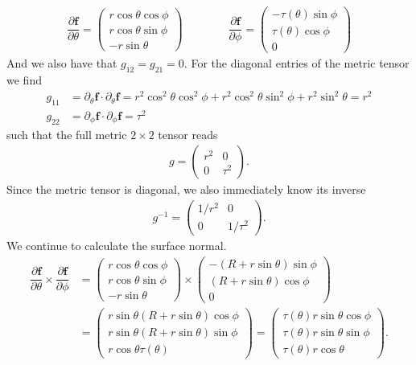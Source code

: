 \documentclass[11pt, DINA4, fleqn]{amsart}
\def\vf{\boldsymbol{f}\xspace}
\begin{document}
\begin{align}
\dfrac{\partial \vf}{\partial \theta} =
\begin{pmatrix}
r\cos\theta\cos\phi \\
r\cos\theta\sin\phi \\
-r\sin\theta
\end{pmatrix}
\qquad \qquad
\dfrac{\partial \vf}{\partial \phi} =
\begin{pmatrix}
-\tau(\theta) \sin\phi\\
\tau(\theta) \cos\phi \\
0
\end{pmatrix}
\end{align}
And we also have that $g_{12} = g_{21} = 0$.
For the diagonal entries of the metric tensor we find
\begin{align}
g_{11} &= \partial_{\theta}\vf \cdot \partial_{\theta}\vf= 
r^2\cos^2\theta\cos^2\phi + r^2\cos^2\theta\sin^2\phi + r^2\sin^2\theta = r^2 \\
g_{22} &= \partial_{\phi}\vf \cdot \partial_{\phi}\vf= \tau^2
\end{align}
such that the full metric $2\times 2$ tensor reads
\begin{align}
g = \begin{pmatrix}
r^2 & 0 \\
0 & \tau^2
\end{pmatrix}.
\end{align}
Since the metric tensor is diagonal, we also immediately know its inverse
\begin{align}
g^{-1} = \begin{pmatrix}
1/r^2 & 0 \\
0 & 1/\tau^2
\end{pmatrix}.
\end{align}
We continue to calculate the surface normal.
\begin{align}
\dfrac{\partial \vf}{\partial \theta} \times \dfrac{\partial \vf}{\partial \phi} 
&=
\begin{pmatrix}
r\cos\theta\cos\phi \\
r\cos\theta\sin\phi \\
-r\sin\theta
\end{pmatrix}
\times
\begin{pmatrix}
-(R+r\sin\theta)\sin\phi \\
(R+r\sin\theta)\cos\phi \\
0
\end{pmatrix} \\
&= \begin{pmatrix}
r\sin\theta(R+r\sin\theta)\cos\phi \\
r\sin\theta(R+r\sin\theta)\sin\phi \\
r\cos\theta \tau(\theta)
\end{pmatrix}
= \begin{pmatrix}
\tau(\theta) r \sin\theta \cos\phi \\
\tau(\theta) r \sin\theta \sin\phi \\
\tau(\theta) r\cos\theta
\end{pmatrix}.
\end{align}
\end{document}
